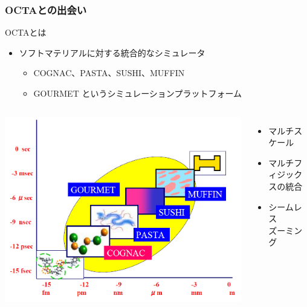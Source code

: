 \documentclass[12pt, dvipdfmx]{beamer}
\begin{document}
\begin{frame}
    \frametitle{OCTAとの出会い}
        \begin{block}{OCTAとは}
            \begin{itemize}
                \item ソフトマテリアルに対する統合的なシミュレータ
                \begin{itemize}
                    \item COGNAC、PASTA、SUSHI、MUFFIN
                    \item GOURMET というシミュレーションプラットフォーム
                \end{itemize}
            \end{itemize}
        \end{block}
        \begin{columns}[c, onlytextwidth]
            \centering
            \includegraphics[width=\textwidth]{octa.png}
                \begin{itemize}
                    \item マルチスケール
                    \item マルチフィジックスの統合
                    \item シームレス\\ズーミング
                \end{itemize}
        \end{columns}    
\end{frame}
\end{document}
